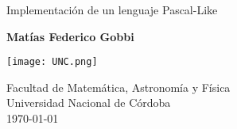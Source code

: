 \begin{titlepage}
    \begin{center}
    
    \vspace*{1cm}
    
    \Huge
    \textbf{\Lenguaje{}}
    
    \vspace{0.5cm}
    
    \Large
    Implementación de un lenguaje Pascal-Like
    
    \vspace{1.5cm}
    
    \textbf{Matías Federico Gobbi}
    
    \vfill
    
    \texttt{[image: UNC.png]}
    
    Facultad de Matemática, Astronomía y Física
    \\
    Universidad Nacional de Córdoba
    \\
    \today
            
    \end{center}
\end{titlepage}
